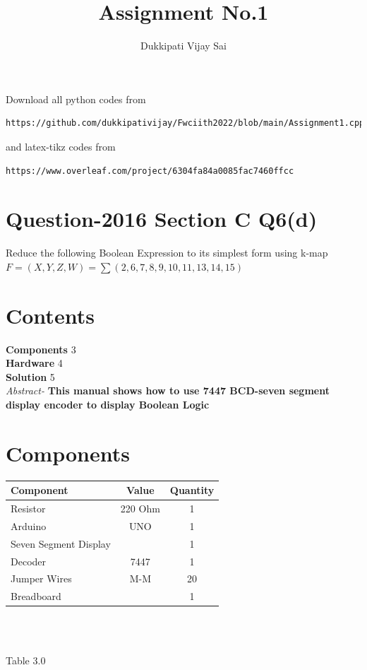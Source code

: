 \documentclass[journal,12pt,twocolumn]{IEEEtran}
\begin{document}
\title{Assignment No.1}

\author{Dukkipati Vijay Sai}
\maketitle
\newpage
\bigskip
\renewcommand{\thefigure}{\theenumi}
\renewcommand{\thetable}{\theenumi}

Download all python codes from 
\begin{lstlisting}
https://github.com/dukkipativijay/Fwciith2022/blob/main/Assignment1.cpp
\end{lstlisting}
%
and latex-tikz codes from 
%
\begin{lstlisting}
https://www.overleaf.com/project/6304fa84a0085fac7460ffcc
\end{lstlisting}
%
\section{Question-2016 Section C Q6(d)}

Reduce the following Boolean Expression to its simplest form using k-map
$F=(X,Y,Z,W)= \sum(2,6,7,8,9,10,11,13,14,15)$
\section{Contents}
\raggedright
\textbf{Components}
\hspace{10em} 3
\\\textbf{Hardware}
\hspace{11em} 4
\\\textbf{Solution}
\hspace{11.8em}   5\\
\textit{Abstract-}
\textbf{This manual shows how to use 7447 BCD-seven segment display encoder to display Boolean Logic}
\section{Components}
\centering
\begin{tabular}{|l|c|c|}
\hline
Component & Value & Quantity\\
\hline
Resistor & 220 Ohm & 1\\
\hline
Arduino & UNO & 1\\
\hline
Seven Segment Display & & 1\\
\hline
Decoder & 7447 & 1\\
\hline
Jumper Wires & M-M & 20\\
\hline
Breadboard & & 1\\
\hline
\end{tabular}\\
\
\centerline{Table 3.0}
\end{document}
